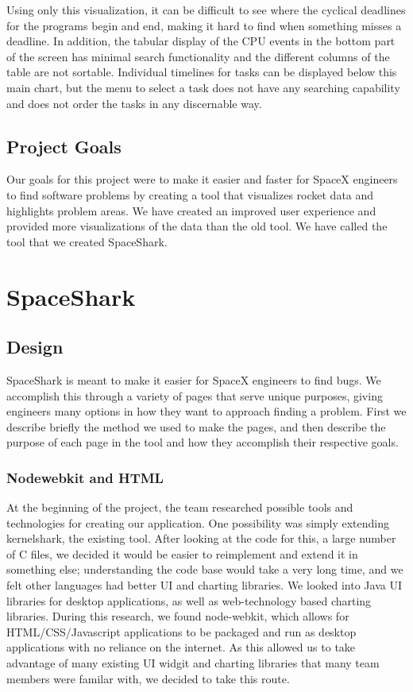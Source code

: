 \documentclass{hmcclinic}
\begin{document}
Using only this visualization, it can be difficult to see where the cyclical
deadlines for the programs begin and end, making it hard to find when something
misses a deadline. In addition, the tabular display of the CPU events in the
bottom part of the screen has minimal search functionality and the different
columns of the table are not sortable. Individual timelines for tasks can be
displayed below this main chart, but the menu to select a task does not have
any searching capability and does not order the tasks in any discernable way.

\section{Project Goals} %
Our goals for this project were to make it easier and faster for SpaceX engineers to find software problems by creating a tool that visualizes rocket data and highlights problem areas. We have created an improved user experience and provided more visualizations of the data than the old tool. We have called the tool that we created SpaceShark.

\chapter{SpaceShark}
\section{Design} %

  SpaceShark is meant to make it easier for SpaceX engineers to find bugs. We
  accomplish this through a variety of pages that serve unique purposes, giving
  engineers many options in how they want to approach finding a problem. First
  we describe briefly the method we used to make the pages, and then describe
  the purpose of each page in the tool and how they accomplish their
  respective goals.

  \subsection{Nodewebkit and HTML} %
    At the beginning of the project, the team researched possible tools and
    technologies for creating our application. One possibility was simply
    extending kernelshark, the existing tool. After looking at the code for
    this, a large number of C files, we decided it would be easier to
    reimplement and extend it in something else; understanding the code base
    would take a very long time, and we felt other languages had better
    UI and charting libraries. We looked into Java UI libraries for
    desktop applications, as well as web-technology based charting libraries.
    During this research, we found node-webkit, which allows for
    HTML/CSS/Javascript applications to be packaged and run as desktop
    applications with no reliance on the internet. As this allowed us to take
    advantage of many existing UI widgit and charting libraries that many team
    members were familar with, we decided to take this route.
\end{document}
